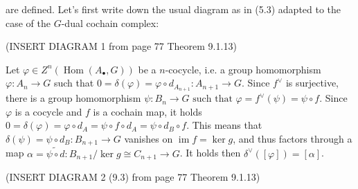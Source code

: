 are defined. Let's first write down the usual diagram as in (5.3) adapted to the case of the \(G\)-dual cochain complex:

(INSERT DIAGRAM 1 from page 77 Theorem 9.1.13)

Let \(\varphi \in Z^n(\operatorname{Hom}(A_\bullet, G))\) be a \( n \)-cocycle, i.e. a group homomorphism \( \varphi \colon A_n \to G \) such that 
\(0 = \delta(\varphi) = \varphi \circ d_{A_{n+1}} \colon A_{n+1} \to G.\)
Since \(f^\vee\) is surjective, there is a group homomorphism 
\(\psi \colon B_n \to G \text{ such that } \varphi = f^\vee(\psi) = \psi \circ f.\)
Since \(\varphi\) is a cocycle and \( f \) is a cochain map, it holds
\(0 = \delta(\varphi) = \varphi \circ d_A = \psi \circ f \circ d_A = \psi \circ d_B \circ f.\)
This means that \(\delta(\psi) = \psi \circ d_B \colon B_{n+1} \to G\) vanishes on \(\operatorname{im} f = \ker g\), 
and thus factors through a map \(\alpha = \widetilde{\psi \circ d} \colon B_{n+1}/ \ker g \cong C_{n+1} \to G\). 
It holds then \(\delta^\vee([\varphi]) = [\alpha]\).

(INSERT DIAGRAM 2 (9.3) from page 77 Theorem 9.1.13)
